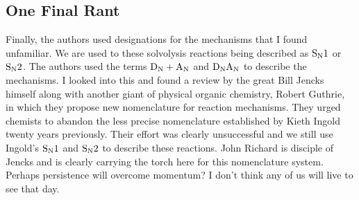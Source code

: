 \documentclass{tufte-handout}
\begin{document}
\subsection{One Final Rant}

Finally, the authors used designations for the mechanisms that I found unfamiliar. We are used to these solvolysis reactions being described as $\rm S_N1$ or $\rm S_N2$. The authors used the terms $\rm D_N + A_N$  and $\rm D_NA_N$ to describe the mechanisms. I looked into this and found a review by the great Bill Jencks himself along with another giant of physical organic chemistry, Robert Guthrie, in which they propose new nomenclature for reaction mechanisms. They urged chemists to abandon the less precise nomenclature established by Kieth Ingold twenty years previously. Their effort was clearly unsuccessful and we still use Ingold's $\rm S_N1$ and $\rm S_N2$ to describe these reactions. John Richard is disciple of Jencks and is clearly carrying the torch here for this nomenclature system. Perhaps persistence will overcome momentum? I don't think any of us will live to see that day.


\nobibliography{}
\end{document}

